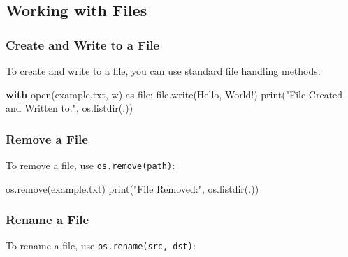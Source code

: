 \documentclass[
  letterpaper,
  DIV=11,
  numbers=noendperiod]{scrreprt}
\newenvironment{Shaded}{\begin{snugshade}}{\end{snugshade}}
\newcommand{\BuiltInTok}[1]{\textcolor[rgb]{0.00,0.23,0.31}{#1}}
\newcommand{\ControlFlowTok}[1]{\textcolor[rgb]{0.00,0.23,0.31}{\textbf{#1}}}
\newcommand{\ImportTok}[1]{\textcolor[rgb]{0.00,0.46,0.62}{#1}}
\newcommand{\NormalTok}[1]{\textcolor[rgb]{0.00,0.23,0.31}{#1}}
\newcommand{\StringTok}[1]{\textcolor[rgb]{0.13,0.47,0.30}{#1}}
\begin{document}
\subsection{Working with Files}\label{working-with-files}

\subsubsection{Create and Write to a
File}\label{create-and-write-to-a-file}

To create and write to a file, you can use standard file handling
methods:

\begin{Shaded}
\begin{Highlighting}[]
\ControlFlowTok{with} \BuiltInTok{open}\NormalTok{(}\StringTok{\textquotesingle{}example.txt\textquotesingle{}}\NormalTok{, }\StringTok{\textquotesingle{}w\textquotesingle{}}\NormalTok{) }\ImportTok{as} \BuiltInTok{file}\NormalTok{:}
    \BuiltInTok{file}\NormalTok{.write(}\StringTok{\textquotesingle{}Hello, World!\textquotesingle{}}\NormalTok{)}
\BuiltInTok{print}\NormalTok{(}\StringTok{"File Created and Written to:"}\NormalTok{, os.listdir(}\StringTok{\textquotesingle{}.\textquotesingle{}}\NormalTok{))}
\end{Highlighting}
\end{Shaded}

\subsubsection{Remove a File}\label{remove-a-file}

To remove a file, use \texttt{os.remove(path)}:

\begin{Shaded}
\begin{Highlighting}[]
\NormalTok{os.remove(}\StringTok{\textquotesingle{}example.txt\textquotesingle{}}\NormalTok{)}
\BuiltInTok{print}\NormalTok{(}\StringTok{"File Removed:"}\NormalTok{, os.listdir(}\StringTok{\textquotesingle{}.\textquotesingle{}}\NormalTok{))}
\end{Highlighting}
\end{Shaded}

\subsubsection{Rename a File}\label{rename-a-file}

To rename a file, use \texttt{os.rename(src,\ dst)}:
\end{document}
